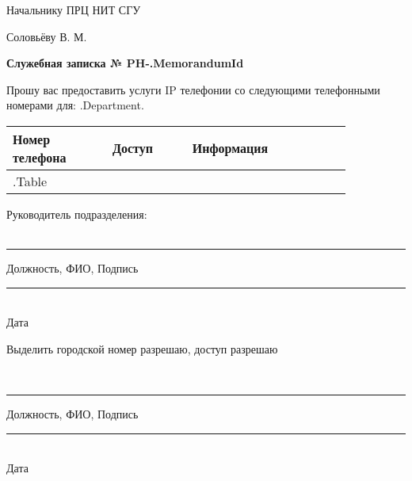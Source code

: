 \documentclass[12pt]{article}
\begin{document}
\begin{flushright}
Начальнику ПРЦ НИТ СГУ

Соловьёву В. М. \\[50pt]
\end{flushright}

\begin{center}
\large
\textbf{Служебная записка № PH-{{.MemorandumId}} } \\[20pt]
\end{center}
\begin{flushleft}
\large
Прошу вас предоставить услуги IP телефонии со следующими телефонными номерами для: {{.Department}}.
\end{flushleft}




\begin{table}[!h]
\large
\centering
\label{my-label}
\begin{tabular}{|p{0.25\linewidth}|p{0.20\linewidth}|p{0.40\linewidth}|}
\hline
Номер телефона & Доступ & Информация \\
\hline
{{.Table}}
\end{tabular}
\end{table}


\normalsize
\begin{flushleft}
\large
Руководитель подразделения:\\~\\
\end{flushleft}
\centering
\noindent\rule{550pt}{0.4pt}
\large
Должность, ФИО, Подпись\\[50pt]

\begin{flushright}
\normalsize
\noindent\rule{100pt}{0.4pt} \\
Дата           
\end{flushright}

\begin{flushleft}
Выделить городской номер разрешаю, доступ разрешаю
\end{flushleft}
 
\\

\centering
\noindent\rule{550pt}{0.4pt}
\large
Должность, ФИО, Подпись\\[50pt]

\begin{flushright}
\normalsize
\noindent\rule{100pt}{0.4pt} \\
Дата           
\end{flushright}
\end{document}
